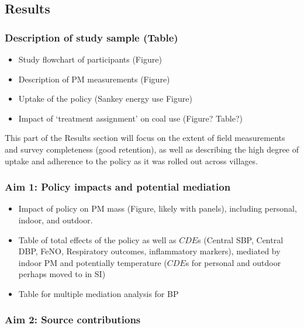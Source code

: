 \documentclass[
  letterpaper,
  DIV=11,
  numbers=noendperiod]{scrartcl}
\providecommand{\tightlist}{%
  \setlength{\itemsep}{0pt}\setlength{\parskip}{0pt}}\usepackage{longtable,booktabs,array}
\begin{document}
\subsection{Results}\label{results-1}

\subsubsection{Description of study sample
(Table)}\label{description-of-study-sample-table}

\begin{itemize}
\tightlist
\item
  Study flowchart of participants (Figure)
\item
  Description of PM measurements (Figure)
\item
  Uptake of the policy (Sankey energy use Figure)
\item
  Impact of `treatment assignment' on coal use (Figure? Table?)
\end{itemize}

This part of the Results section will focus on the extent of field
measurements and survey completeness (good retention), as well as
describing the high degree of uptake and adherence to the policy as it
was rolled out across villages.

\subsubsection{Aim 1: Policy impacts and potential
mediation}\label{aim-1-policy-impacts-and-potential-mediation}

\begin{itemize}
\tightlist
\item
  Impact of policy on PM mass (Figure, likely with panels), including
  personal, indoor, and outdoor.
\item
  Table of total effects of the policy as well as \(CDE\)s (Central SBP,
  Central DBP, FeNO, Respiratory outcomes, inflammatory markers),
  mediated by indoor PM and potentially temperature (\(CDE\)s for
  personal and outdoor perhaps moved to in SI)
\item
  Table for multiple mediation analysis for BP
\end{itemize}

\subsubsection{Aim 2: Source
contributions}\label{aim-2-source-contributions}
\end{document}
